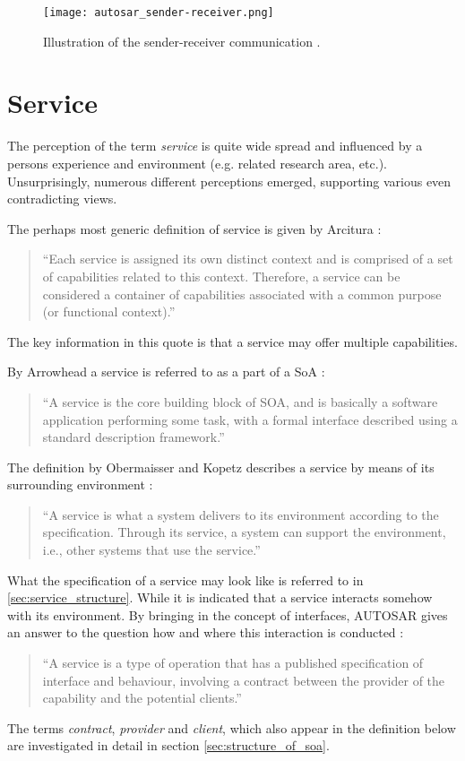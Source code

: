 \begin{figure}[!htbp]
\centering
\texttt{[image: autosar\_sender-receiver.png]}
\caption{Illustration of the sender-receiver communication \cite{autosar_intro}.}
\label{fig:autosar_sender-receiver}
\end{figure}










\section{Service}
\label{ch:service} 
The perception of the term \emph{service} is quite wide spread and influenced by a persons experience and environment (e.g. related research area, etc.). Unsurprisingly, numerous different perceptions emerged, supporting various even contradicting views.

The perhaps most generic definition of service is given by Arcitura \cite{arcitura}:
\begin{quote}
``Each service is assigned its own distinct context and is comprised of a set of capabilities related to this context. Therefore, a service can be considered a container of capabilities associated with a common purpose (or functional context).''
\end{quote}
The key information in this quote is that a service may offer multiple capabilities.

By Arrowhead a service is referred to as a part of a SoA \cite{arrowhead}:
\begin{quote}
``A service is the core building block of SOA, and is basically a software application performing some task, with a formal interface described using a standard description framework.''
\end{quote}

The definition by Obermaisser and Kopetz describes a service by means of its surrounding environment \cite[p.8]{genesys}:
\begin{quote}
``A service is what a system delivers to its environment according to the specification. Through its service, a system can support the environment, i.e., other systems that use the service.''
\end{quote}
What the specification of a service may look like is referred to in \ref{sec:service_structure}. While it is indicated that a service interacts somehow with its environment. By bringing in the concept of interfaces, AUTOSAR gives an answer to the question how and where this interaction is conducted \cite{autosar_glossary}:
\begin{quote}
``A service is a type of operation that has a published specification of interface and behaviour, involving a contract between the provider of the capability and the potential clients.'' 
\end{quote}
The terms \emph{contract}, \emph{provider} and \emph{client}, which also appear in the definition below are investigated in detail in section \ref{sec:structure_of_soa}.

